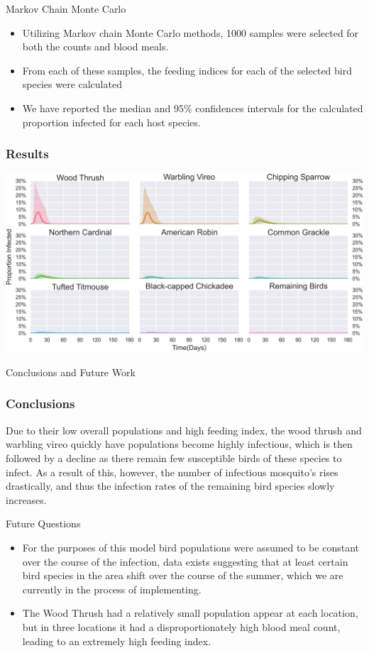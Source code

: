 \documentclass{beamer}
\begin{document}
\begin{frame}{Markov Chain Monte Carlo}
\begin{itemize}
\item Utilizing Markov chain Monte Carlo methods, 1000 samples were selected for both the counts and blood meals.
\item From each of these samples, the feeding indices for each of the selected bird species were calculated
\item We have reported the median and 95\% confidences intervals for the calculated proportion infected for each host species. 
\end{itemize}
\end{frame}


\begin{frame}
\frametitle{Results}
\begin{center}
\includegraphics[width=0.8\linewidth]{results}
\end{center}
\end{frame}





\begin{frame}{Conclusions and Future Work}
\frametitle{Conclusions}
Due to their low overall populations and high feeding index, the wood thrush and warbling vireo quickly have populations become highly infectious, which is then followed by a decline as there remain few susceptible birds of these species to infect.  As a result of this, however, the number of infectious mosquito's rises drastically, and thus the infection rates of the remaining bird species slowly increases.
\end{frame}

\begin{frame}{Future Questions}
\begin{itemize}
\item For the purposes of this model bird populations were assumed to be constant over the course of the infection, data exists suggesting that at least certain bird species in the area shift over the course of the summer, which we are currently in the process of implementing.
\item The Wood Thrush had a relatively small population appear at each location, but in three locations it had a disproportionately high blood meal count, leading to an extremely high feeding index. 
\end{itemize}
\end{frame}
\end{document}
